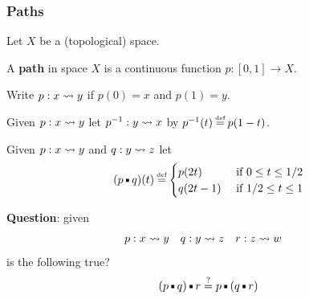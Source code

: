 \documentclass[handout]{beamer} %
\begin{document}
\begin{frame}
  \frametitle{Paths}
  
  Let $X$ be a (topological) space.

  \begin{definition}
    A \textbf{path} in space $X$ is a continuous function $p : [0, 1] \to X$.

  \end{definition}

  \medskip
  
  Write $p : x \rightsquigarrow y$ if $p(0) = x$ and $p(1) = y$.
  
  \medskip
  
  Given $p : x \rightsquigarrow y$ let $p^{-1} : y \rightsquigarrow x$ by $p^{-1}(t) \defeq p(1 - t)$.

  \medskip

  Given $p : x \rightsquigarrow y$ and $q : y \rightsquigarrow z$ let
  \[
    (p \Concat q)(t) \defeq
      \begin{cases}
        p(2t) & \text{ if $0 \leq t \leq 1/2$} \\
        q(2t - 1) & \text{ if $1/2 \leq t \leq 1$} \\
      \end{cases}
  \]
  
  \textbf{Question}: given 
  \begin{align*}
    p &: x \rightsquigarrow y
    &
    q &: y \rightsquigarrow z
    &
    r &: z \rightsquigarrow w
  \end{align*}
  is the following true?
  \[
    (p \Concat q) \Concat r \overset{?}{=} p \Concat (q \Concat r)
  \]
\end{frame}
\end{document}
